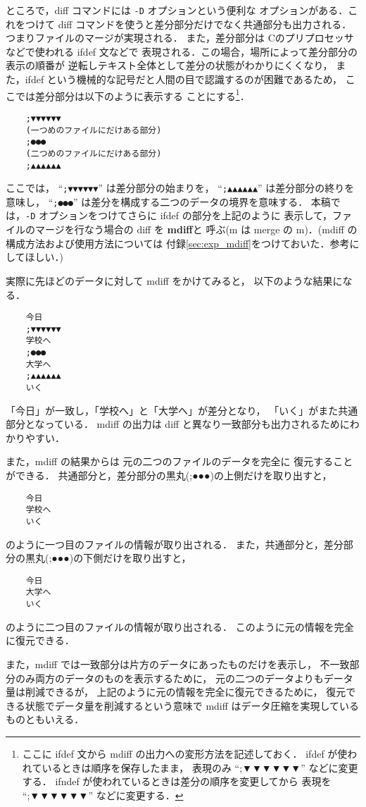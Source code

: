 ところで，diff コマンドには \verb+-D+ オプションという便利な
オプションがある．これをつけて
diff コマンドを使うと差分部分だけでなく共通部分も出力される．
つまりファイルのマージが実現される．
また，差分部分は Cのプリプロセッサなどで使われる ifdef 文などで
表現される．この場合，場所によって差分部分の表示の順番が
逆転しテキスト全体として差分の状態がわかりにくくなり，
また，ifdef という機械的な記号だと人間の目で認識するのが困難であるため，
ここでは差分部分は以下のように表示する
ことにする\footnote{ここに ifdef 文から mdiff の出力への変形方法を記述しておく．
ifdef が使われているときは順序を保存したまま，
表現のみ ``;▼▼▼▼▼▼'' などに変更する．
ifndef が使われているときは差分の順序を変更してから
表現を ``;▼▼▼▼▼▼'' などに変更する．}．
\begin{verbatim}
    ;▼▼▼▼▼▼
    (一つめのファイルにだけある部分)
    ;●●●
    (二つめのファイルにだけある部分)
    ;▲▲▲▲▲▲
\end{verbatim}
ここでは， ``\verb+;▼▼▼▼▼▼+'' は差分部分の始まりを，
``\verb+;▲▲▲▲▲▲+'' は差分部分の終りを意味し，
``\verb+;●●●+'' は差分を構成する二つのデータの境界を意味する．
本稿では，\verb+-D+ オプションをつけてさらに ifdef の部分を上記のように
表示して，ファイルのマージを行なう場合の diff を {\bf mdiff}と
呼ぶ(m は merge の m)．(mdiff の構成方法および使用方法については
付録\ref{sec:exp_mdiff}をつけておいた．参考にしてほしい．)

実際に先ほどのデータに対して mdiff をかけてみると，
以下のような結果になる．
\begin{verbatim}
    今日
    ;▼▼▼▼▼▼
    学校へ
    ;●●●
    大学へ
    ;▲▲▲▲▲▲
    いく
\end{verbatim}
「今日」が一致し，「学校へ」と「大学へ」が差分となり，
「いく」がまた共通部分となっている．
mdiff の出力は diff と異なり一致部分も出力されるためにわかりやすい．

また，mdiff の結果からは
元の二つのファイルのデータを完全に
復元することができる．
共通部分と，差分部分の黒丸(;●●●)の上側だけを取り出すと，
\begin{verbatim}
    今日
    学校へ
    いく
\end{verbatim}
のように一つ目のファイルの情報が取り出される．
また，共通部分と，差分部分の黒丸(;●●●)の下側だけを取り出すと，
\begin{verbatim}
    今日
    大学へ
    いく
\end{verbatim}
のように二つ目のファイルの情報が取り出される．
このように元の情報を完全に復元できる．

また，mdiff では一致部分は片方のデータにあったものだけを表示し，
不一致部分のみ両方のデータのものを表示するために，
元の二つのデータよりもデータ量は削減できるが，
上記のように元の情報を完全に復元できるために，
復元できる状態でデータ量を削減するという意味で
mdiff はデータ圧縮を実現しているものともいえる．

